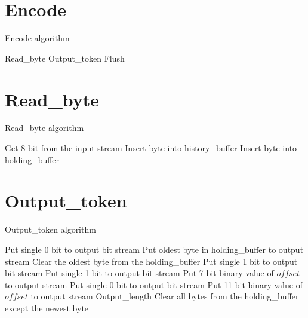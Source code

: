 \documentclass[10pt,letterpaper,pdftex]{article}
\begin{document}
\begin{CJK}{GBK}{song}

\section{Encode}

\begin{algorithm}
\caption{Encode algorithm}\label{encode}
\begin{algorithmic}[1]
 \State Read\_byte
   \State Output\_token
 \EndIf
\EndWhile
\State Flush
\EndProcedure
\end{algorithmic}
\end{algorithm}

\newpage
\section{Read\_byte}

\begin{algorithm}
\caption{Read\_byte algorithm}\label{read_byte}
\begin{algorithmic}[1]
 \State Get 8-bit from the input stream
 \State Insert byte into history\_buffer
 \State Insert byte into holding\_buffer
\EndProcedure
\end{algorithmic}
\end{algorithm}

\newpage
\section{Output\_token}

\begin{algorithm}
\caption{Output\_token algorithm}\label{output_token}
\begin{algorithmic}[1]
  \State Put single 0 bit to output bit stream
  \State Put oldest byte in holding\_buffer to output stream
  \State Clear the oldest byte from the holding\_buffer
 \ElsIf
  \State Put single 1 bit to output bit stream
   \State Put single 1 bit to output bit stream
   \State Put 7-bit binary value of $offset$ to output stream
  \ElsIf
   \State Put single 0 bit to output bit stream
   \State Put 11-bit binary value of $offset$ to output stream
  \EndIf
  \State  Output\_length
  \State  Clear all bytes from the holding\_buffer except the newest byte
 \EndIf
\EndProcedure
\end{algorithmic}
\end{algorithm}


\end{CJK}
\end{document}
